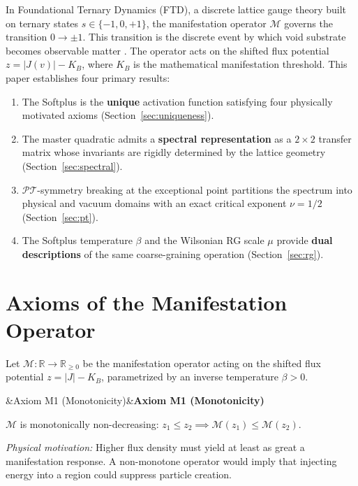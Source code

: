 \documentclass[12pt]{article}
\newcommand{\R}{\mathbb{R}}
\newcommand{\PT}{\mathcal{PT}}
\newcommand{\Man}{\mathcal{M}}
\theoremstyle{definition}
\theoremstyle{remark}
\newenvironment{axiomatic}[1][]{%
  \begin{mdframed}[
    linewidth=1.5pt,
    linecolor=black,
    backgroundcolor=gray!8,
    roundcorner=4pt,
    innertopmargin=10pt,
    innerbottommargin=10pt,
    innerleftmargin=12pt,
    innerrightmargin=12pt,
  ]%
  \ifx&#1&\else\noindent\textsf{\textbf{#1}}\par\vspace{6pt}\fi
}{%
  \end{mdframed}%
}
\begin{document}
In Foundational Ternary Dynamics (FTD), a discrete lattice gauge theory built on ternary states $s \in \{-1, 0, +1\}$, the manifestation operator $\Man$ governs the transition $0 \to \pm 1$. This transition is the discrete event by which void substrate becomes observable matter \cite{Anon2026_Zenodo}. The operator acts on the shifted flux potential $z = |J(v)| - K_B$, where $K_B$ is the mathematical manifestation threshold. This paper establishes four primary results:

\begin{enumerate}[noitemsep]
    \item The Softplus is the \textbf{unique} activation function satisfying four physically motivated axioms (Section~\ref{sec:uniqueness}).
    \item The master quadratic admits a \textbf{spectral representation} as a $2 \times 2$ transfer matrix whose invariants are rigidly determined by the lattice geometry (Section~\ref{sec:spectral}).
    \item $\PT$-symmetry breaking at the exceptional point partitions the spectrum into physical and vacuum domains with an exact critical exponent $\nu = 1/2$ (Section~\ref{sec:pt}).
    \item The Softplus temperature $\beta$ and the Wilsonian RG scale $\mu$ provide \textbf{dual descriptions} of the same coarse-graining operation (Section~\ref{sec:rg}).
\end{enumerate}

\section{Axioms of the Manifestation Operator}
\label{sec:axioms}

Let $\Man : \R \to \R_{\geq 0}$ be the manifestation operator acting on the shifted flux potential $z = |J| - K_B$, parametrized by an inverse temperature $\beta > 0$.

\begin{axiomatic}[Axiom M1 (Monotonicity)]
$\Man$ is monotonically non-decreasing: $z_1 \leq z_2 \implies \Man(z_1) \leq \Man(z_2)$.

\vspace{4pt}
\noindent\textit{Physical motivation:} Higher flux density must yield at least as great a manifestation response. A non-monotone operator would imply that injecting energy into a region could suppress particle creation.
\end{axiomatic}
\end{document}
